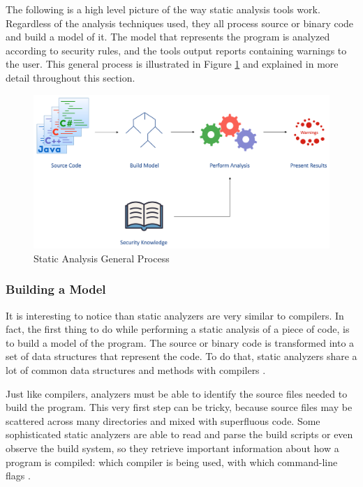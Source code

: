 The following is a high level picture of the way static analysis tools work. Regardless of the analysis techniques used, they all process source or binary code and build a model of it. The model that represents the program is analyzed according to security rules, and the tools output reports containing warnings to the user. This general process is illustrated in Figure \ref{fig:static-analysis-process} and explained in more detail throughout this section.

\vspace{0.8cm}

\begin{figure}[h]
    \centering
    \includegraphics[scale=0.41]{figures/static-analysis-process}
    \caption{Static Analysis General Process \cite{chess2007secure}}
    \label{fig:static-analysis-process}
\end{figure}

\vspace{0.5cm}

\subsubsection{Building a Model}

It is interesting to notice than static analyzers are very similar to compilers. In fact, the first thing to do while performing a static analysis of a piece of code, is to build a model of the program. The source or binary code is transformed into a set of data structures that represent the code. To do that, static analyzers share a lot of common data structures and methods with compilers \cite{chess2007secure}.

Just like compilers, analyzers must be able to identify the source files needed to build the program. This very first step can be tricky, because source files may be scattered across many directories and mixed with superfluous code. Some sophisticated static analyzers are able to read and parse the build scripts or even observe the build system, so they retrieve important information about how a program is compiled: which compiler is being used, with which command-line flags \cite{anderson2008use}.

